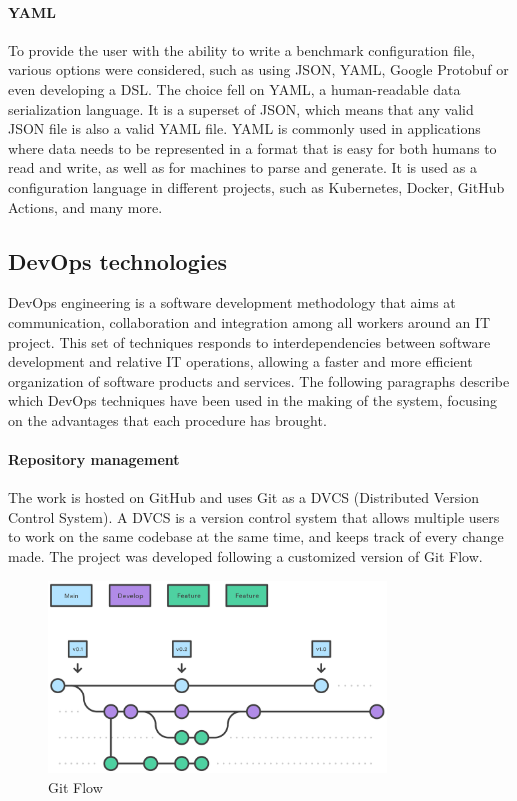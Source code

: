 \documentclass[12pt,a4paper,openright,twoside]{book}
\begin{document}
\paragraph*{YAML}
To provide the user with the ability to write a benchmark configuration file, various options were considered, such as using JSON, YAML, Google Protobuf or even developing a DSL. 
The choice fell on YAML, a human-readable data serialization language. It is a superset of JSON, which means that any valid JSON file is also a valid YAML file.
YAML is commonly used in applications where data needs to be represented in a format that is easy for both humans to read and write, as well as for machines to parse and generate.
It is used as a configuration language in different projects, such as Kubernetes, Docker, GitHub Actions, and many more.

\subsection*{DevOps technologies}
DevOps engineering is a software development methodology that aims at communication, collaboration and integration among all workers around an IT project. 
This set of techniques responds to interdependencies between software development and relative IT operations, allowing a faster and more efficient organization of software products and services.
The following paragraphs describe which DevOps techniques have been used in the making of the system, focusing on the advantages that each procedure has brought.

\paragraph*{Repository management}
The work is hosted on GitHub and uses Git as a DVCS (Distributed Version Control System).
A DVCS is a version control system that allows multiple users to work on the same codebase at the same time, and keeps track of every change made.
The project was developed following a customized version of Git Flow. 

\begin{figure}[h]
  \centering
  \includegraphics[width=0.8\textwidth]{figures/gitflow.png}
  \caption{Git Flow}
  \label{fig:git-flow}
\end{figure}
\end{document}
